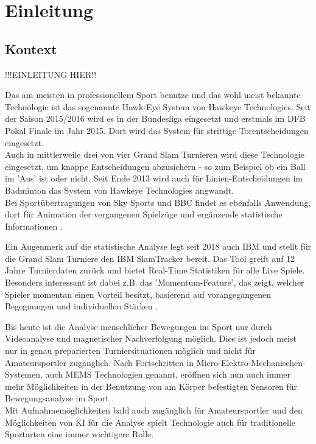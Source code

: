 \chapter{Einleitung}
\section{Kontext}
!!!EINLEITUNG HIER!!

Das am meisten in professionellem Sport benutze und das wohl meist bekannte Technologie ist das sogenannte Hawk-Eye System von Hawkeye Technologies. Seit der Saison 2015/2016 wird es in der Bundesliga eingesetzt und erstmals im DFB Pokal Finale im Jahr 2015. Dort wird das System für strittige Torentscheidungen eingesetzt. \\
Auch in mittlerweile drei von vier Grand Slam Turnieren wird diese Technologie eingesetzt, um knappe Entscheidungen abzusichern - so zum Beispiel ob ein Ball im 'Aus' ist oder nicht. Seit Ende 2013 wird auch für Linien-Entscheidungen im Badminton das System von Hawkeye Technologies angwandt. \\
Bei Sportübertragungen von Sky Sports und BBC findet es ebenfalls Anwendung, dort für Animation der vergangenen Spielzüge und ergänzende statistische Informationen \cite{hawkeye}.

Ein Augenmerk auf die statistische Analyse legt seit 2018 auch IBM und stellt für die Grand Slam Turniere den IBM SlamTracker bereit. Das Tool greift auf 12 Jahre Turnierdaten zurück und bietet Real-Time Statistiken für alle Live Spiele. Besonders interessant ist dabei z.B. das 'Momentum-Feature', das zeigt, welcher Spieler momentan einen Vorteil besitzt, basierend auf vorangegangenen Begegnungen und individuellen Stärken \cite{watson}.

Bis heute ist die Analyse menschlicher Bewegungen im Sport nur durch Videoanalyse und magnetischer Nachverfolgung möglich. Dies ist jedoch meist nur in genau preparierten Turniersituationen möglich und nicht für Amateursportler zugänglich. Nach Fortschritten in Micro-Elektro-Mechanischen-Systemen, auch MEMS Technologien genannt, eröffnen sich nun auch immer mehr Möglichkeiten in der Benutzung von am Körper befestigten Sensoren für Bewegungsanalyse im Sport \cite{sensors}. \\

Mit Aufnahmemöglichkeiten bald auch zugänglich für Amateursportler und den Möglichkeiten von KI für die Analyse spielt Technologie auch für traditionelle Sportarten eine immer wichtigere Rolle.   

